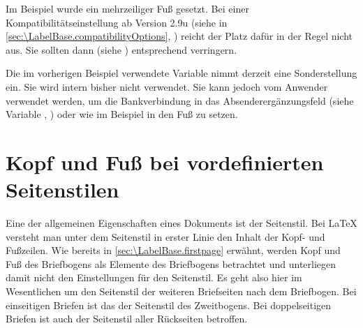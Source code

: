 Im Beispiel wurde ein mehrzeiliger Fuß gesetzt. Bei einer
Kompatibilitätseinstellung ab Version
2.9u (siehe
 in
\autoref{sec:\LabelBase.compatibilityOptions},
) reicht der Platz dafür in der Regel
nicht aus. Sie sollten dann  (siehe
) entsprechend
verringern.%
\EndIndexGroup

\begin{Declaration}
\end{Declaration}%
 Die im vorherigen Beispiel
verwendete Variable  nimmt derzeit eine Sonderstellung
ein. Sie wird intern bisher nicht verwendet. Sie kann jedoch vom Anwender
verwendet werden, um die Bankverbindung in das
Absenderergänzungsfeld (siehe Variable ,
) oder wie im Beispiel in den Fuß zu
setzen.%
%
\EndIndexGroup
%
\EndIndexGroup




\section{Kopf und Fuß bei vordefinierten Seitenstilen}
\BeginIndexGroup
{}

Eine der allgemeinen Eigenschaften eines Dokuments ist der Seitenstil. Bei
{\LaTeX} versteht man unter dem Seitenstil in erster Linie den Inhalt der
Kopf- und Fußzeilen. Wie bereits in
\autoref{sec:\LabelBase.firstpage} erwähnt, werden Kopf und Fuß des Briefbogens
als Elemente des Briefbogens betrachtet und unterliegen damit nicht den
Einstellungen für den Seitenstil. Es geht also hier im Wesentlichen um den
Seitenstil der weiteren Briefseiten nach dem Briefbogen. Bei einseitigen
Briefen ist das der Seitenstil des Zweitbogens. Bei doppelseitigen Briefen ist
auch der Seitenstil aller Rückseiten betroffen.


